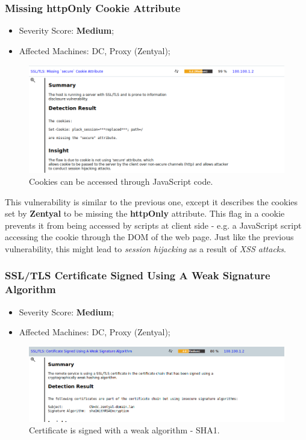 \subsubsection{Missing httpOnly Cookie Attribute}
\begin{itemize}
\item Severity Score: \textbf{Medium};
\item Affected Machines: DC, Proxy (Zentyal);
\end{itemize}
\begin{figure}[!htb]
\centering
\begin{minipage}{.5\textwidth}
  \centering
  \includegraphics[width=1\textwidth]{secureCookiesDCVuln.png}
  \caption[a]{Cookies can be accessed through JavaScript code.}\label{fig:13}
\end{minipage}%
\end{figure}

This vulnerability is similar to the previous one, except it describes the cookies set by \textbf{Zentyal} to be missing the \textbf{httpOnly} attribute. This flag in a cookie prevents it from being accessed by scripts at client side - e.g. a JavaScript script accessing the cookie through the DOM of the web page. Just like the previous vulnerability, this might lead to \textit{session hijacking} as a result of \textit{XSS attacks}.

\subsubsection{SSL/TLS Certificate Signed Using A Weak Signature Algorithm}
\begin{itemize}
\item Severity Score: \textbf{Medium};
\item Affected Machines: DC, Proxy (Zentyal);
\end{itemize}
\begin{figure}[!htb]
\centering
\begin{minipage}{.5\textwidth}
  \centering
  \includegraphics[width=1\textwidth]{weakSHA1CertificateDCVuln.png}
  \caption[a]{Certificate is signed with a weak algorithm - SHA1.}\label{fig:14}
\end{minipage}%
\end{figure}

